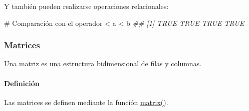 \documentclass[
  letterpaper,
  DIV=11,
  numbers=noendperiod]{scrreprt}
\let\oldparagraph\paragraph
\renewcommand{\paragraph}[1]{\oldparagraph{#1}\mbox{}}
\newenvironment{Shaded}{\begin{snugshade}}{\end{snugshade}}
\newcommand{\CommentTok}[1]{\textcolor[rgb]{0.37,0.37,0.37}{#1}}
\newcommand{\DocumentationTok}[1]{\textcolor[rgb]{0.37,0.37,0.37}{\textit{#1}}}
\newcommand{\NormalTok}[1]{\textcolor[rgb]{0.00,0.23,0.31}{#1}}
\newcommand{\SpecialCharTok}[1]{\textcolor[rgb]{0.37,0.37,0.37}{#1}}
\begin{document}
Y también pueden realizarse operaciones relacionales:

\begin{Shaded}
\begin{Highlighting}[]
\CommentTok{\# Comparación con el operador \textless{}}
\NormalTok{a }\SpecialCharTok{\textless{}}\NormalTok{ b}
\DocumentationTok{\#\# [1] TRUE TRUE TRUE TRUE}
\end{Highlighting}
\end{Shaded}

\hypertarget{matrices}{%
\subsubsection{Matrices}\label{matrices}}

Una matriz es una estructura bidimensional de filas y columnas.

\hypertarget{definiciuxf3n-1}{%
\paragraph{Definición}\label{definiciuxf3n-1}}

Las matrices se definen mediante la función
\href{https://rdrr.io/r/base/matrix.html}{matrix()}.
\end{document}

